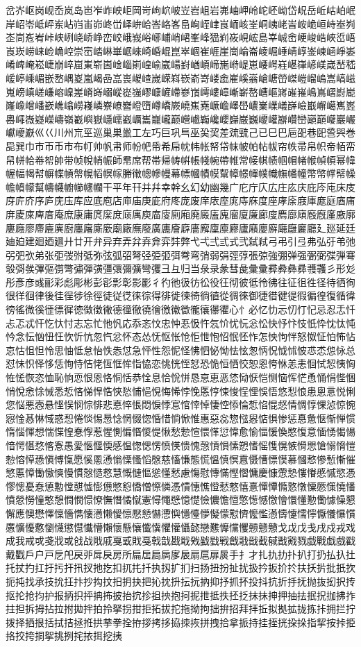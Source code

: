 岔岕岖岗岘岙岚岛岜岝岞岟岠岡岢岣岤岥岦岧岨岩岪岫岬岭岮岯岰岱岲岳岴岵岶岷岸岹岺岻岼岽岾岿峀峁峂峃峄峅峆峇峈峉峊峋峌峍峎峏峐峑峒峓峔峕峖峗峘峙峚峛峜峝峞峟峠峡峢峣峤峥峦峧峨峩峪峫峬峭峮峯峰峱峲峳峴峵島峷峸峹峺峻峼峽峾峿崀崁崂崃崄崅崆崇崈崉崊崋崌崍崎崏崐崑崒崓崔崕崖崗崘崙崚崛崜崝崞崟崠崡崢崣崤崥崦崧崨崩崪崫崬崭崮崯崰崱崲崳崴崵崶崷崸崹崺崻崼崽崾崿嵀嵁嵂嵃嵄嵅嵆嵇嵈嵉嵊嵋嵌嵍嵎嵏嵐嵑嵒嵓嵔嵕嵖嵗嵘嵙嵚嵛嵜嵝嵞嵟嵠嵡嵢嵣嵤嵥嵦嵧嵨嵩嵪嵫嵬嵭嵮嵯嵰嵱嵲嵳嵴嵵嵶嵷嵸嵹嵺嵻嵼嵽嵾嵿嶀嶁嶂嶃嶄嶅嶆嶇嶈嶉嶊嶋嶌嶍嶎嶏嶐嶑嶒嶓嶔嶕嶖嶗嶘嶙嶚嶛嶜嶝嶞嶟嶠嶡嶢嶣嶤嶥嶦嶧嶨嶩嶪嶫嶬嶭嶮嶯嶰嶱嶲嶳嶴嶵嶶嶷嶸嶹嶺嶻嶼嶽嶾嶿巀巁巂巃巄巅巆巇巈巉巊巋巌巍巎巏巐巑巒巓巔巕巖巗巘巙巚巛巜川州巟巠巡巢巣巤工左巧巨巩巪巫巬巭差巯巰己已巳巴巵巶巷巸巹巺巻巼巽巾巿帀币市布帄帅帆帇师帉帊帋希帍帎帏帐帑帒帓帔帕帖帗帘帙帚帛帜帝帞帟帠帡帢帣帤帥带帧帨帩帪師帬席帮帯帰帱帲帳帴帵帶帷常帹帺帻帼帽帾帿幀幁幂幃幄幅幆幇幈幉幊幋幌幍幎幏幐幑幒幓幔幕幖幗幘幙幚幛幜幝幞幟幠幡幢幣幤幥幦幧幨幩幪幫幬幭幮幯幰幱干平年幵并幷幸幹幺幻幼幽幾广庀庁庂広庄庅庆庇庈庉床庋庌庍庎序庐庑庒库应底庖店庘庙庚庛府庝庞废庠庡庢庣庤庥度座庨庩庪庫庬庭庮庯庰庱庲庳庴庵庶康庸庹庺庻庼庽庾庿廀廁廂廃廄廅廆廇廈廉廊廋廌廍廎廏廐廑廒廓廔廕廖廗廘廙廚廛廜廝廞廟廠廡廢廣廤廥廦廧廨廩廪廫廬廭廮廯廰廱廲廳廴廵延廷廸廹建廻廼廽廾廿开弁异弃弄弅弆弇弈弉弊弋弌弍弎式弐弑弒弓弔引弖弗弘弙弚弛弜弝弞弟张弡弢弣弤弥弦弧弨弩弪弫弬弭弮弯弰弱弲弳弴張弶強弸弹强弻弼弽弾弿彀彁彂彃彄彅彆彇彈彉彊彋彌彍彎彏彐彑归当彔录彖彗彘彙彚彛彜彝彞彟彠彡形彣彤彥彦彧彨彩彪彫彬彭彮彯彰影彲彳彴彵彶彷彸役彺彻彼彽彾彿往征徂徃径待徆徇很徉徊律後徍徎徏徐徑徒従徔徕徖得徘徙徚徛徜徝從徟徠御徢徣徤徥徦徧徨復循徫徬徭微徯徰徱徲徳徴徵徶德徸徹徺徻徼徽徾徿忀忁忂心忄必忆忇忈忉忊忋忌忍忎忏忐忑忒忓忔忕忖志忘忙忚忛応忝忞忟忠忡忢忣忤忥忦忧忨忩忪快忬忭忮忯忰忱忲忳忴念忶忷忸忹忺忻忼忽忾忿怀态怂怃怄怅怆怇怈怉怊怋怌怍怎怏怐怑怒怓怔怕怖怗怘怙怚怛怜思怞怟怠怡怢怣怤急怦性怨怩怪怫怬怭怮怯怰怱怲怳怴怵怶怷怸怹怺总怼怽怾怿恀恁恂恃恄恅恆恇恈恉恊恋恌恍恎恏恐恑恒恓恔恕恖恗恘恙恚恛恜恝恞恟恠恡恢恣恤恥恦恧恨恩恪恫恬恭恮息恰恱恲恳恴恵恶恷恸恹恺恻恼恽恾恿悀悁悂悃悄悅悆悇悈悉悊悋悌悍悎悏悐悑悒悓悔悕悖悗悘悙悚悛悜悝悞悟悠悡悢患悤悥悦悧您悩悪悫悬悭悮悯悰悱悲悳悴悵悶悷悸悹悺悻悼悽悾悿惀惁惂惃惄情惆惇惈惉惊惋惌惍惎惏惐惑惒惓惔惕惖惗惘惙惚惛惜惝惞惟惠惡惢惣惤惥惦惧惨惩惪惫惬惭惮惯惰惱惲想惴惵惶惷惸惹惺惻惼惽惾惿愀愁愂愃愄愅愆愇愈愉愊愋愌愍愎意愐愑愒愓愔愕愖愗愘愙愚愛愜愝愞感愠愡愢愣愤愥愦愧愨愩愪愫愬愭愮愯愰愱愲愳愴愵愶愷愸愹愺愻愼愽愾愿慀慁慂慃慄慅慆慇慈慉慊態慌慍慎慏慐慑慒慓慔慕慖慗慘慙慚慛慜慝慞慟慠慡慢慣慤慥慦慧慨慩慪慫慬慭慮慯慰慱慲慳慴慵慶慷慸慹慺慻慼慽慾慿憀憁憂憃憄憅憆憇憈憉憊憋憌憍憎憏憐憑憒憓憔憕憖憗憘憙憚憛憜憝憞憟憠憡憢憣憤憥憦憧憨憩憪憫憬憭憮憯憰憱憲憳憴憵憶憷憸憹憺憻憼憽憾憿懀懁懂懃懄懅懆懇懈應懊懋懌懍懎懏懐懑懒懓懔懕懖懗懘懙懚懛懜懝懞懟懠懡懢懣懤懥懦懧懨懩懪懫懬懭懮懯懰懱懲懳懴懵懶懷懸懹懺懻懼懽懾懿戀戁戂戃戄戅戆戇戈戉戊戋戌戍戎戏成我戒戓戔戕或戗战戙戚戛戜戝戞戟戠戡戢戣戤戥戦戧戨戩截戫戬戭戮戯戰戱戲戳戴戵戶户戸戹戺戻戼戽戾房所扁扂扃扄扅扆扇扈扉扊手扌才扎扏扐扑扒打扔払扖扗托扙扚扛扜扝扞扟扠扡扢扣扤扥扦执扨扩扪扫扬扭扮扯扰扱扲扳扴扵扶扷扸批扺扻扼扽找承技抁抂抃抄抅抆抇抈抉把抋抌抍抎抏抐抑抒抓抔投抖抗折抙抚抛抜抝択抟抠抡抢抣护报抦抧抨抩抪披抬抭抮抯抰抱抲抳抴抵抶抷抸抹抺抻押抽抾抿拀拁拂拃拄担拆拇拈拉拊拋拌拍拎拏拐拑拒拓拔拕拖拗拘拙拚招拜拝拞拟拠拡拢拣拤拥拦拧拨择拪拫括拭拮拯拰拱拲拳拴拵拶拷拸拹拺拻拼拽拾拿挀持挂挃挄挅挆指挈按挊挋挌挍挎挏挐挑挒挓挔挕挖挗